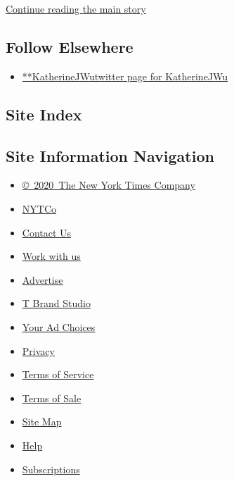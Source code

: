 \protect\hyperlink{after-mid2}{Continue reading the main story}

\hypertarget{follow-elsewhere}{%
\subsection{Follow Elsewhere}\label{follow-elsewhere}}

\begin{itemize}
\tightlist
\item
  \href{https://twitter.com/KatherineJWu}{**KatherineJWutwitter page for
  KatherineJWu}
\end{itemize}

\hypertarget{site-index}{%
\subsection{Site Index}\label{site-index}}

\hypertarget{site-information-navigation}{%
\subsection{Site Information
Navigation}\label{site-information-navigation}}

\begin{itemize}
\tightlist
\item
  \href{https://help.nytimes.com/hc/en-us/articles/115014792127-Copyright-notice}{©~2020~The
  New York Times Company}
\end{itemize}

\begin{itemize}
\tightlist
\item
  \href{https://www.nytco.com/}{NYTCo}
\item
  \href{https://help.nytimes.com/hc/en-us/articles/115015385887-Contact-Us}{Contact
  Us}
\item
  \href{https://www.nytco.com/careers/}{Work with us}
\item
  \href{https://nytmediakit.com/}{Advertise}
\item
  \href{http://www.tbrandstudio.com/}{T Brand Studio}
\item
  \href{https://www.nytimes.com/privacy/cookie-policy\#how-do-i-manage-trackers}{Your
  Ad Choices}
\item
  \href{https://www.nytimes.com/privacy}{Privacy}
\item
  \href{https://help.nytimes.com/hc/en-us/articles/115014893428-Terms-of-service}{Terms
  of Service}
\item
  \href{https://help.nytimes.com/hc/en-us/articles/115014893968-Terms-of-sale}{Terms
  of Sale}
\item
  \href{https://spiderbites.nytimes.com}{Site Map}
\item
  \href{https://help.nytimes.com/hc/en-us}{Help}
\item
  \href{https://www.nytimes.com/subscription?campaignId=37WXW}{Subscriptions}
\end{itemize}
